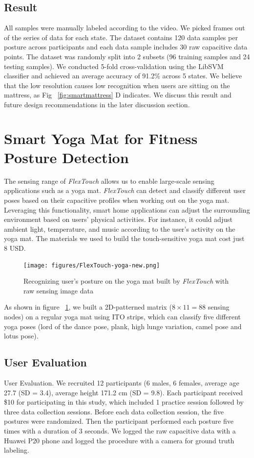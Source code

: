 \subsection{Result}
All samples were manually labeled according to the video. We picked frames out of the series of data for each state. The dataset contains 120 data samples per posture across participants and each data sample includes 30 raw capacitive data points. The dataset was randomly split into 2 subsets (96 training samples and 24 testing samples). We conducted 5-fold cross-validation using the LibSVM classifier and achieved an average accuracy of 91.2\% across 5 states. We believe that the low resolution causes low recognition when users are sitting on the mattress, as Fig ~\ref{fig:smartmattress} D indicates. We discuss this result and future design recommendations in the later discussion section.   

\section{Smart Yoga Mat for Fitness Posture Detection}
The sensing range of \textit{FlexTouch} allows us to enable large-scale sensing applications such as a yoga mat.  \textit{FlexTouch} can detect and classify different user poses based on their capacitive profiles when working out on the yoga mat. Leveraging this functionality, smart home applications can adjust the surrounding environment based on users' physical activities. For instance, it could adjust ambient light, temperature, and music according to the user's activity on the yoga mat. The materials we used to build the touch-sensitive yoga mat cost just 8 USD. 

\begin{figure}[ht]
\centering
  \texttt{[image: figures/FlexTouch-yoga-new.png]}
  \caption{Recognizing user's posture on the yoga mat built by \textit{FlexTouch} with raw sensing image data}  \label{fig:yogamat}
\end{figure}

As shown in figure ~\ref{fig:yogamat}, we built a 2D-patterned matrix ($8\times11 = 88$ sensing nodes) on a regular yoga mat using ITO strips, which can classify five different yoga poses (lord of the dance pose, plank, high lunge variation, camel pose and lotus pose).

\subsection{User Evaluation}
User Evaluation. We recruited 12 participants (6 males, 6 females, average age 27.7 (SD = 3.4), average height 171.2 cm (SD = 9.8). Each participant received \$10 for participating in this study, which included 1 practice session followed by three data collection sessions. Before each data collection session, the five postures were randomized. Then the participant performed each posture five times with a duration of 3 seconds. We logged the raw capacitive data with a Huawei P20 phone and logged the procedure with a camera for ground truth labeling.

